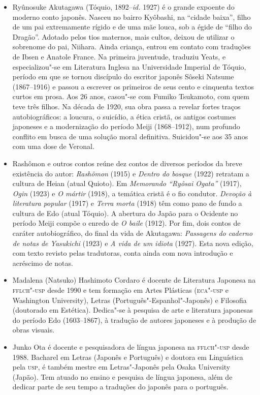 \begin{itemize}



\item 
Ryûnosuke Akutagawa (Tóquio, 1892--\textit{id.} 1927) é o grande expoente 
do moderno conto japonês. Nasceu no bairro Kyôbashi, na ``cidade
baixa'', filho de um pai extremamente rígido e de uma mãe louca, sob a égide de 
``filho do Dragão''. Adotado pelos tios maternos, mais cultos,
deixou de utilizar o sobrenome do pai, Niihara. Ainda criança, entrou
em contato com traduções de Ibsen e Anatole France. Na primeira
juventude, traduziu Yeats, e especializou"-se em Literatura Inglesa na
Universidade Imperial de Tóquio, período em que se tornou discípulo do
escritor japonês Sôseki Natsume (1867--1916) e passou a escrever os
primeiros de seus cento e cinquenta textos curtos em prosa. Aos 26
anos, casou"-se com Fumiko Tsukamoto, com quem teve três filhos.
Na década de 1920, sua obra passa a revelar fortes traços
autobiográficos: a loucura, o suicídio, a ética cristã, os antigos 
costumes japoneses e a modernização do período Meiji (1868--1912),
num profundo conflito em busca de uma solução moral definitiva. 
Suicidou"-se aos 35 anos com uma dose de Veronal. 
        
\item
Rashômon e outros contos reúne dez contos de diversos períodos da
breve existência do autor: \textit{Rashômon} (1915) e \textit{Dentro do bosque} (1922) 
retratam a cultura de Heian (atual Quioto). Em \textit{Memorando ``Ryôsai Ogata''} (1917), 
\textit{Ogin} (1923) e \textit{O mártir} (1918), a temática cristã é o fio condutor. 
\textit{Devoção à literatura popular} (1917) e \textit{Terra morta} (1918) têm como pano de fundo 
a cultura de Edo (atual Tóquio). A abertura do Japão para o Ocidente no período 
Meiji compõe o enredo de \textit{O baile} (1912). Por fim, dois contos de caráter autobiográfico, 
do final da vida de Akutagawa: \textit{Passagens do caderno de notas de Yasukichi} (1923) 
e \textit{A vida de um idiota} (1927). Esta nova edição, com texto revisto pelas tradutoras, 
conta ainda com nova introdução e acréscimo de notas.      
\pagebreak 

\item
Madalena (Natsuko) Hashimoto Cordaro é docente de Literatura Japonesa na 
\textsc{fflch"-usp} desde 1990 e tem formação em Artes Plásticas (\textsc{eca"-usp} 
e Washington University), Letras (Português"-Espanhol"-Japonês) e Filosofia (doutorado em Estética). 
Dedica"-se à pesquisa de arte e literatura japonesas do período Edo (1603--1867), 
à tradução de autores japoneses e à produção de obras visuais.
 
\item
Junko Ota é docente e pesquisadora de língua japonesa na \textsc{fflch"-usp} 
desde 1988. Bacharel em Letras (Japonês e Português) e doutora em Linguística pela \textsc{usp}, é 
também mestre em Letras"-Japonês pela Osaka University (Japão). Tem atuado no ensino e pesquisa 
de língua japonesa, além de dedicar parte de seu tempo a traduções do japonês para o português.   

\end{itemize}

